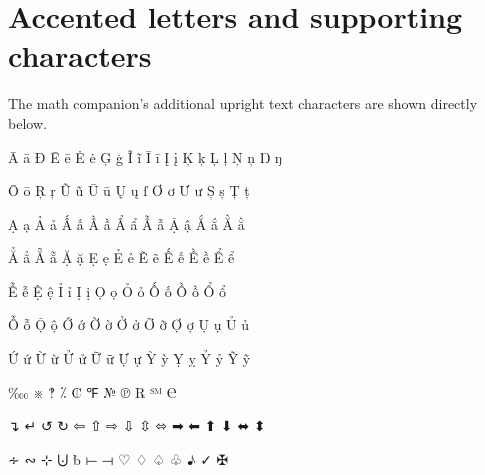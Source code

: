 \documentclass[11pt]{article}
\begin{document}
\section*{Accented letters and supporting characters}
The math companion's additional upright text characters are shown directly below.

\bigskip
{\coveragefont\fontsize{17}{26}\selectfont
Ā ā Đ Ē ē Ė ė Ģ ģ Ĩ ĩ Ī ī Į į Ķ ķ Ļ ļ Ņ ņ Ŋ ŋ\par
Ō ō Ŗ ŗ Ũ ũ Ū ū Ų ų ſ Ơ ơ Ư ư Ș ș Ț ț\par
Ạ ạ Ả ả Ấ ấ Ầ ầ Ẩ ẩ Ẫ ẫ Ậ ậ Ắ ắ Ằ ằ\par
Ẳ ẳ Ẵ ẵ Ặ ặ Ẹ ẹ Ẻ ẻ Ẽ ẽ Ế ế Ề ề Ể ể\par
Ễ ễ Ệ ệ Ỉ ỉ Ị ị Ọ ọ Ỏ ỏ Ố ố Ồ ồ Ổ ổ\par
Ỗ ỗ Ộ ộ Ớ ớ Ờ ờ Ở ở Ỡ ỡ Ợ ợ Ụ ụ Ủ ủ\par
Ứ ứ Ừ ừ Ử ử Ữ ữ Ự ự Ỳ ỳ Ỵ ỵ Ỷ ỷ Ỹ ỹ\par
‱ ※ ‽ ⁒ ₡ ℉ № ℗ ℞ ℠ ℮\par
↴ ↵ ↺ ↻ ⇦ ⇧ ⇨ ⇩ ⇳ ⬄ ➡ ⬅ ⬆ ⬇ ⬌ ⬍\par
∻ ∾ ⊹ ⨃ ␢ ⟝ ⟞ ♡ ♢ ♤ ♧ ♪ ✓ ✠\par
}
\end{document}
